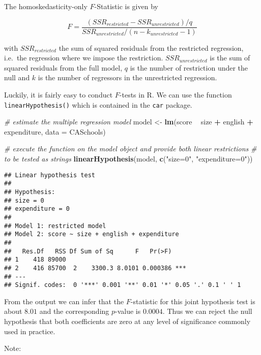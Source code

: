 \documentclass[]{book}
\newenvironment{Shaded}{\begin{snugshade}}{\end{snugshade}}
\newcommand{\KeywordTok}[1]{\textcolor[rgb]{0.13,0.29,0.53}{\textbf{#1}}}
\newcommand{\DataTypeTok}[1]{\textcolor[rgb]{0.13,0.29,0.53}{#1}}
\newcommand{\StringTok}[1]{\textcolor[rgb]{0.31,0.60,0.02}{#1}}
\newcommand{\CommentTok}[1]{\textcolor[rgb]{0.56,0.35,0.01}{\textit{#1}}}
\newcommand{\OperatorTok}[1]{\textcolor[rgb]{0.81,0.36,0.00}{\textbf{#1}}}
\newcommand{\NormalTok}[1]{#1}
\theoremstyle{definition}
\theoremstyle{definition}
\theoremstyle{definition}
\theoremstyle{remark}
\begin{document}
The homoskedasticity-only \(F\)-Statistic is given by

\[ F = \frac{(SSR_{restricted} - SSR_{unrestricted})/q}{SSR_{unrestricted} / (n-k_{unrestricted}-1)} \]

with \(SSR_{restricted}\) the sum of squared residuals from the
restricted regression, i.e.~the regression where we impose the
restriction. \(SSR_{unrestricted}\) is the sum of squared residuals from
the full model, \(q\) is the number of restriction under the null and
\(k\) is the number of regressors in the unrestricted regression.

Luckily, it is fairly easy to conduct \(F\)-tests in R. We can use the
function \texttt{linearHypothesis()} which is contained in the
\texttt{car} package.

\begin{Shaded}
\begin{Highlighting}[]
\CommentTok{# estimate the multiple regression model}
\NormalTok{model <-}\StringTok{ }\KeywordTok{lm}\NormalTok{(score }\OperatorTok{~}\StringTok{ }\NormalTok{size }\OperatorTok{+}\StringTok{ }\NormalTok{english }\OperatorTok{+}\StringTok{ }\NormalTok{expenditure, }\DataTypeTok{data =}\NormalTok{ CASchools)}

\CommentTok{# execute the function on the model object and provide both linear restrictions }
\CommentTok{# to be tested as strings}
\KeywordTok{linearHypothesis}\NormalTok{(model, }\KeywordTok{c}\NormalTok{(}\StringTok{"size=0"}\NormalTok{, }\StringTok{"expenditure=0"}\NormalTok{))}
\end{Highlighting}
\end{Shaded}

\begin{verbatim}
## Linear hypothesis test
## 
## Hypothesis:
## size = 0
## expenditure = 0
## 
## Model 1: restricted model
## Model 2: score ~ size + english + expenditure
## 
##   Res.Df   RSS Df Sum of Sq      F   Pr(>F)    
## 1    418 89000                                 
## 2    416 85700  2    3300.3 8.0101 0.000386 ***
## ---
## Signif. codes:  0 '***' 0.001 '**' 0.01 '*' 0.05 '.' 0.1 ' ' 1
\end{verbatim}

From the output we can infer that the \(F\)-statistic for this joint
hypothesis test is about \(8.01\) and the corresponding \(p\)-value is
\(0.0004\). Thus we can reject the null hypothesis that both
coefficients are zero at any level of significance commonly used in
practice.

Note:
\end{document}
